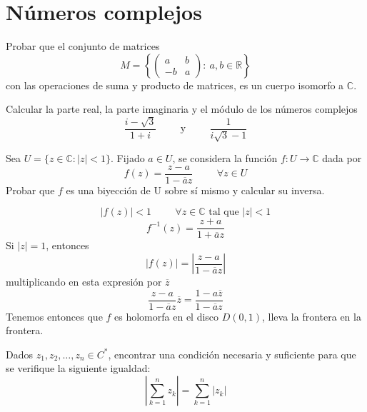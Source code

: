 \section{Números complejos}
\begin{ejer}
	Probar que el conjunto de matrices
	$$ M = \left\{ 
	\left( \begin{array}{cc}
	a & b \\
	-b & a \end{array} \right)
	: \ a, b\in \mathbb{R}\right\} $$
	con las operaciones de suma y producto de matrices, es un cuerpo isomorfo a $\mathbb{C}$.
\end{ejer}


\begin{ejer}
	Calcular la parte real, la parte imaginaria y el módulo de los números complejos
	$$ \frac{i-\sqrt{3}}{1+i}\hspace{1cm}\text{y}\hspace{1cm} \frac{1}{i\sqrt{3}-1} $$
\end{ejer}



\begin{ejer}
	Sea $U=\{ z\in\mathbb{C} : |z|<1 \}$.
	Fijado $a \in U$, se considera la función $f: U\rightarrow\mathbb{C}$ dada por
	$$ f(z) = \frac{z-a}{1-\overline{a}z}\hspace{1cm} \forall z\in U $$
	Probar que $f$ es una biyección de U sobre sí mismo y calcular su inversa.
\end{ejer}

\begin{sol}
	
	$$|f(z)| < 1 \hspace{1cm} \forall z\in\mathbb{C} \text{ tal que } |z| <1$$
	$$f^{-1}(z)= \frac{z+a}{1+\overline{a}z}$$
	Si $|z|=1$, entonces $$|f(z)| = 			
	\left|\frac{z-a}{1-\overline{a}z}\right|$$
	multiplicando en esta expresión por $\overline{z}$
	$$ \frac{z-a}{1-\overline{a}z} \overline{z}  =  \frac{1-a\overline{z}}{1-\overline{a}z}$$
	Tenemos entonces que $f$ es holomorfa en el disco $D(0,1)$, lleva la frontera en la frontera.
\end{sol}


\begin{ejer}
	Dados $z_1, z_2, \ldots , z_n \in C^{\ast}$, encontrar una condición necesaria y suficiente para que se verifique la siguiente igualdad:
	$$ \left|\sum_{k=1}^n z_k\right| = \sum_{k=1}^n |z_k|$$
\end{ejer}


